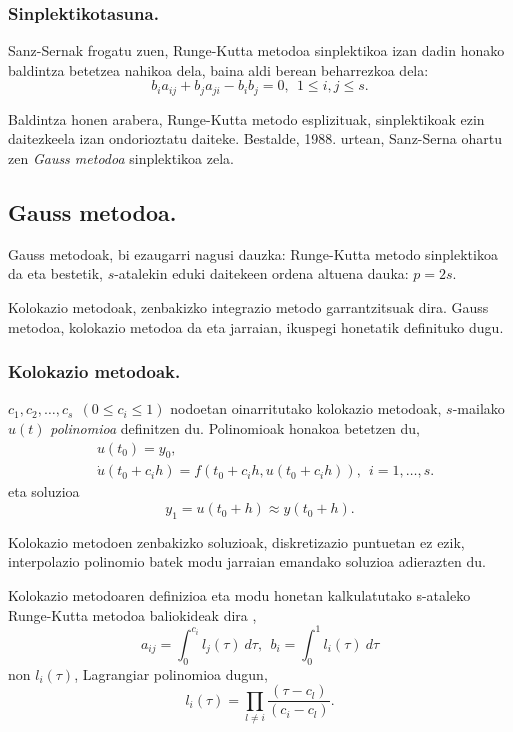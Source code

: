 \subsubsection*{Sinplektikotasuna.}

Sanz-Sernak  \cite{JMSanz-Serna1994} frogatu zuen,  Runge-Kutta metodoa sinplektikoa izan dadin honako baldintza betetzea nahikoa dela, baina aldi berean beharrezkoa dela:
\begin{equation}
\label{eq:simplektik}
b_{i}a_{ij}+b_{j}a_{ji}-b_{i}b_{j}=0, \ \ 1 \leqslant i,j \leqslant s.
\end{equation}

Baldintza honen arabera, Runge-Kutta metodo esplizituak, sinplektikoak ezin daitezkeela izan ondorioztatu daiteke. Bestalde, 1988. urtean, Sanz-Serna \cite{JMSanz-Serna1994} ohartu zen \emph{Gauss metodoa} sinplektikoa zela. 

\subsection{Gauss metodoa.}

Gauss metodoak, bi ezaugarri nagusi dauzka: Runge-Kutta metodo sinplektikoa da eta bestetik, $s$-atalekin eduki daitekeen ordena altuena  dauka: $p=2s$. 

Kolokazio metodoak, zenbakizko integrazio metodo garrantzitsuak dira. Gauss metodoa, kolokazio metodoa da eta jarraian, ikuspegi honetatik definituko dugu. 

\subsubsection*{Kolokazio metodoak.}

$c_1,c_2,\dots,c_s \ \ (0\leq c_i \leq 1)$ nodoetan oinarritutako kolokazio metodoak, $s$-mailako $u(t)$  \emph{polinomioa} definitzen du. Polinomioak honakoa betetzen du,
\begin{align*}
&u(t_0) =y_0, \\
&\dot{u}(t_0+c_ih) =f(t_0+c_i h, u(t_0+c_i h)), \ \ i=1,\dots,s.
\end{align*}
eta soluzioa 
\begin{equation*}
y_1=u(t_0+h)\approx y(t_0+h).
\end{equation*} 

Kolokazio metodoen zenbakizko soluzioak, diskretizazio puntuetan ez ezik, interpolazio polinomio batek modu jarraian emandako soluzioa adierazten du. 

Kolokazio metodoaren definizioa eta modu honetan kalkulatutako s-ataleko Runge-Kutta metodoa baliokideak dira \cite{Hairer2006}, 
\begin{equation}
a_{ij}=\int_{0}^{c_i} l_j(\tau) \ d\tau, \ \ b_i=\int_{0}^{1} l_i(\tau) \ d\tau
\end{equation}
%
non $l_i(\tau)$, Lagrangiar polinomioa dugun,
\begin{equation}
l_i(\tau)=\prod_{l\neq i} \frac{(\tau-c_l)}{(c_i-c_l)}.
\end{equation}
 
